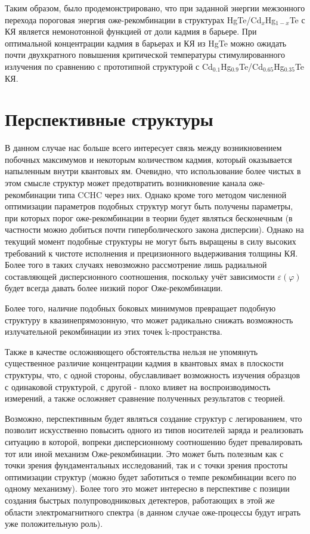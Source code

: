 \documentclass[../main.tex]{subfiles}
\begin{document}
    Таким образом, было продемонстрировано, что при заданной энергии межзонного перехода пороговая энергия оже-рекомбинации в структурах 
    HgTe/Cd${}_{x}$Hg${}_{1-x}$Te с КЯ является немонотонной функцией от доли кадмия в барьере. При оптимальной концентрации кадмия в барьерах и КЯ из HgTe 
    можно ожидать почти двухкратного повышения критической температуры стимулированного излучения по сравнению с прототипной структурой с 
    Cd${}_{0.1}$Hg${}_{0.9}$Te/Cd${}_{0.65}$Hg${}_{0.35}$Te КЯ.

    \section{Перспективные структуры}

    В данном случае нас больше всего интересует связь между возникновением побочных максимумов и некоторым количеством 
    кадмия, который оказывается напыленным внутри квантовых ям. Очевидно, что использование более чистых в этом смысле структур
    может предотвратить возникновение канала оже-рекомбинации типа CCHC через них. Однако кроме того методом численной оптимизации параметров 
    подобных структур могут быть получены параметры, при которых порог оже-рекомбинации в теории будет являться бесконечным (в частности можно добиться почти 
    гиперболического закона дисперсии). Однако на текущий момент подобные структуры не могут быть выращены в силу высоких требований к чистоте исполнения и 
    прецизионного выдерживания толщины КЯ. Более того в таких случаях невозможно рассмотрение лишь радиальной составляющей дисперсионного соотношения,
    поскольку учёт зависимости $\varepsilon(\varphi)$ будет всегда давать более низкий порог Оже-рекомбинации.

    Более того, наличие подобных боковых минимумов превращает подобную структуру в квазинепрямозонную, что может радикально снижать возможность излучательной 
    рекомбинации из этих точек k-пространства. 

    Также в качестве осложняющего обстоятельства нельзя не упомянуть существенное различие концентрации кадмия в квантовых ямах в плоскости структуры,
    что, с одной стороны, обуславливает возможность изучения образцов с одинаковой структурой, с другой - плохо влияет на воспроизводимость измерений,
    а также осложняет сравнение полученных результатов с теорией.

    Возможно, перспективным будет являться создание структур с легированием, что позволит искусственно повысить одного из типов носителей заряда и реализовать 
    ситуацию в которой, вопреки дисперсионному соотношению будет превалировать тот или иной механизм Оже-рекомбинации. Это может быть полезным как с точки зрения 
    фундаментальных исследований, так и с точки зрения простоты оптимизации структур (можно будет заботиться о темпе рекомбинации всего по одному механизму). 
    Более того это может интересно в перспективе с позиции создания быстрых полупроводниковых детектеров, работающих в этой же области электромагнитного спектра 
    (в данном случае оже-процессы будут играть уже положительную роль).
\end{document}
